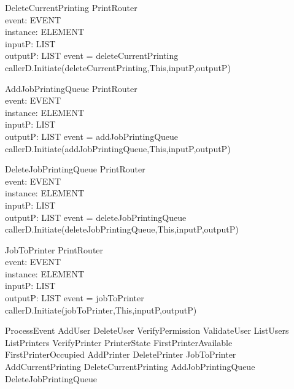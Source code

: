 \begin{schema}{DeleteCurrentPrinting}
\Delta PrintRouter \\
event: EVENT \\
instance: ELEMENT \\
inputP: LIST \\
outputP: LIST
\where event = deleteCurrentPrinting \\
callerD.Initiate(deleteCurrentPrinting,This,inputP,outputP)
\end{schema}

\begin{schema}{AddJobPrintingQueue}
\Delta PrintRouter \\
event: EVENT \\
instance: ELEMENT \\
inputP: LIST \\
outputP: LIST
\where event = addJobPrintingQueue \\
callerD.Initiate(addJobPrintingQueue,This,inputP,outputP)
\end{schema}

\begin{schema}{DeleteJobPrintingQueue}
\Delta PrintRouter \\
event: EVENT \\
instance: ELEMENT \\
inputP: LIST \\
outputP: LIST
\where event = deleteJobPrintingQueue \\
callerD.Initiate(deleteJobPrintingQueue,This,inputP,outputP)
\end{schema}


\begin{schema}{JobToPrinter}
\Delta PrintRouter \\
event: EVENT \\
instance: ELEMENT \\
inputP: LIST \\
outputP: LIST
\where event = jobToPrinter \\
callerD.Initiate(jobToPrinter,This,inputP,outputP)
\end{schema}


\begin{zed}
ProcessEvent
             \sdef AddUser
             \lor DeleteUser
             \lor VerifyPermission
             \lor ValidateUser
             \lor ListUsers
             \lor ListPrinters 
             \lor VerifyPrinter
             \lor PrinterState
             \lor FirstPrinterAvailable
             \lor FirstPrinterOccupied
             \lor AddPrinter
             \lor DeletePrinter
             \lor JobToPrinter
             \lor AddCurrentPrinting
             \lor DeleteCurrentPrinting
             \lor AddJobPrintingQueue
             \lor DeleteJobPrintingQueue
\end{zed}